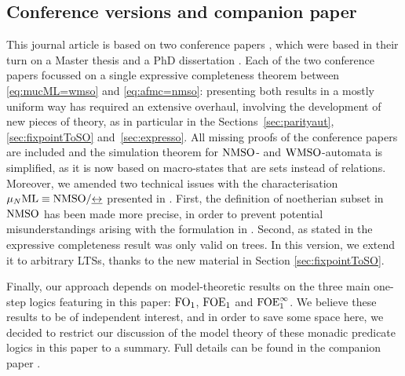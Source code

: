 \subsection{Conference versions and companion paper}
This journal article is based on two conference papers
\cite{DBLP:conf/lics/FacchiniVZ13,DBLP:conf/csl/CarreiroFVZ14},
which were based in their turn on a Master thesis \cite{Zanasi:Thesis:2012}
and a PhD dissertation \cite{carr:frag2015}.
Each of the two conference papers focussed on a single expressive completeness 
theorem between \eqref{eq:mucML=wmso} and \eqref{eq:afmc=nmso}: presenting both
results in a mostly uniform way has required an extensive overhaul, involving
the development of new pieces of theory, as in particular in the
Sections~\ref{sec:parityaut}, \ref{sec:fixpointToSO} and~\ref{sec:expresso}.
All missing proofs of the conference papers are included and the simulation
theorem for $\mathrm{NMSO}$- and $\mathrm{WMSO}$-automata is simplified, as it is now based
on macro-states that are sets instead of relations. 
Moreover, we amended two technical issues with the characterisation 
$\mu_{N}\mathrm{ML} \equiv \mathrm{NMSO} /{\mathrel{\underline{\leftrightarrow}}}$ presented in \cite{DBLP:conf/lics/FacchiniVZ13}.
First, the definition of noetherian subset in $\mathrm{NMSO}$ has been made more 
precise, in order to prevent potential misunderstandings arising with the
formulation in \cite{DBLP:conf/lics/FacchiniVZ13}. 
Second, as stated in \cite{DBLP:conf/lics/FacchiniVZ13} the expressive 
completeness result was only valid on trees. 
In this version, we extend it to arbitrary LTSs, thanks to the new material 
in Section \ref{sec:fixpointToSO}. 

Finally, our approach depends on model-theoretic results on the three main
one-step logics featuring in this paper: $\mathrm{FO}_1$, $\mathrm{FOE}_1$ and $\mathrm{FOE}^{\infty}_1$.
We believe these results to be of independent interest, and in order to save
some space here, we decided to restrict our discussion of the model theory of
these monadic predicate logics in this paper to a summary.
Full details can be found in the companion paper \cite{carr:mode18}.
